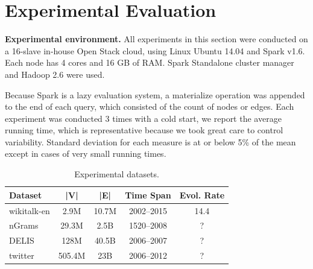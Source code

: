 \section{Experimental Evaluation}
\label{sec:exp}

{\bf Experimental environment.} All experiments in this section were
conducted on a 16-slave in-house Open Stack cloud, using Linux Ubuntu
14.04 and Spark v1.6.  Each node has 4 cores and 16 GB of RAM.  Spark
Standalone cluster manager and Hadoop 2.6 were used.

Because Spark is a lazy evaluation system, a materialize operation was
appended to the end of each query, which consisted of the count of
nodes or edges.  Each experiment was conducted 3 times with a cold
start, we report the average running time, which is representative
because we took great care to control variability.  Standard deviation
for each measure is at or below 5\% of the mean except in cases of
very small running times.

\begin{table}
\caption{Experimental datasets.}
\small
\begin{tabular}{l | c | c | c | c }
\hline
\multicolumn{1}{l|}{\bfseries Dataset} & \multicolumn{1}{c|}{\bfseries |V|} & \multicolumn{1}{c|}{\bfseries |E|} & \multicolumn{1}{c|}{\bfseries Time Span} & \multicolumn{1}{c}{\bfseries Evol. Rate} \\ \hline
wikitalk-en & 2.9M & 10.7M & 2002--2015 & 14.4 \\ \hline
nGrams & 29.3M & 2.5B & 1520--2008 & ? \\ \hline
DELIS & 128M & 40.5B & 2006--2007 & ? \\ \hline
twitter & 505.4M & 23B & 2006--2012 & ? \\ \hline
\end{tabular}
\label{tab:datasets}
\end{table}

